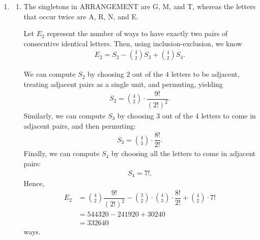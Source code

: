\documentclass[12pt]{article}
\begin{document}
\begin{enumerate}

  \item
    \begin{enumerate}
      \item The singletons in ARRANGEMENT are G, M, and T, whereas
        the letters that occur twice are A, R, N, and E.

        Let $E_2$ represent the number of ways to have exactly two
        pairs of consecutive identical letters. Then, using
        inclusion-exclusion, we know
        \begin{align*}
          E_2 = S_2 - {3 \choose 2}S_3 + {4 \choose 2}S_4.
        \end{align*}

        We can compute $S_2$ by choosing 2 out of the 4 letters to be
        adjacent, treating adjacent pairs as a single unit, and
        permuting, yielding
        \begin{align*}
          S_2 = {4 \choose 2} \cdot \dfrac{9!}{(2!)^2}.
        \end{align*}
        Similarly, we can compute $S_3$ by choosing $3$ out of the
        $4$ letters to come in adjacent pairs, and then permuting:
        \begin{align*}
          S_3 = {4 \choose 3} \cdot \dfrac{8!}{2!}.
        \end{align*}
        Finally, we can compute $S_4$ by choosing all the letters to
        come in adjacent pairs:
        \begin{align*}
          S_4 = 7!.
        \end{align*}
        Hence,
        \begin{align*}
          E_2 &= {4 \choose 2} \dfrac{9!}{(2!)^2} - {3 \choose 2}
          \cdot {4 \choose 3} \cdot \dfrac{8!}{2!} + {4 \choose 2} \cdot 7! \\
          &= 544320 - 241920 + 30240 \\
          &= 332640
        \end{align*}
        ways.


\end{enumerate}
\end{enumerate}
\end{document}
